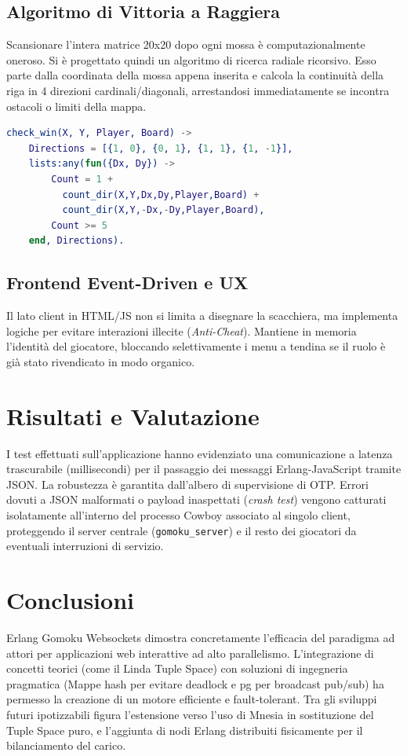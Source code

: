 \documentclass{article}
\begin{document}
\subsection{Algoritmo di Vittoria a Raggiera}
Scansionare l'intera matrice 20x20 dopo ogni mossa \`e computazionalmente oneroso. Si \`e progettato quindi un algoritmo di ricerca radiale ricorsivo. Esso parte dalla coordinata della mossa appena inserita e calcola la continuit\`a della riga in 4 direzioni cardinali/diagonali, arrestandosi immediatamente se incontra ostacoli o limiti della mappa.

\begin{lstlisting}[language=Erlang, caption=Algoritmo di scansione radiale direzionale]
check_win(X, Y, Player, Board) ->
    Directions = [{1, 0}, {0, 1}, {1, 1}, {1, -1}],
    lists:any(fun({Dx, Dy}) ->
        Count = 1 + 
          count_dir(X,Y,Dx,Dy,Player,Board) +
          count_dir(X,Y,-Dx,-Dy,Player,Board),
        Count >= 5
    end, Directions).
\end{lstlisting}

\subsection{Frontend Event-Driven e UX}
Il lato client in HTML/JS non si limita a disegnare la scacchiera, ma implementa logiche per evitare interazioni illecite (\textit{Anti-Cheat}). Mantiene in memoria l'identit\`a del giocatore, bloccando selettivamente i menu a tendina se il ruolo \`e gi\`a stato rivendicato in modo organico.

\section{Risultati e Valutazione}
I test effettuati sull'applicazione hanno evidenziato una comunicazione a latenza trascurabile (millisecondi) per il passaggio dei messaggi Erlang-JavaScript tramite JSON. 
La robustezza \`e garantita dall'albero di supervisione di OTP. Errori dovuti a JSON malformati o payload inaspettati (\textit{crash test}) vengono catturati isolatamente all'interno del processo Cowboy associato al singolo client, proteggendo il server centrale (\texttt{gomoku\_server}) e il resto dei giocatori da eventuali interruzioni di servizio.

\section{Conclusioni}
Erlang Gomoku Websockets dimostra concretamente l'efficacia del paradigma ad attori per applicazioni web interattive ad alto parallelismo. L'integrazione di concetti teorici (come il Linda Tuple Space) con soluzioni di ingegneria pragmatica (Mappe hash per evitare deadlock e pg per broadcast pub/sub) ha permesso la creazione di un motore efficiente e fault-tolerant.
Tra gli sviluppi futuri ipotizzabili figura l'estensione verso l'uso di Mnesia in sostituzione del Tuple Space puro, e l'aggiunta di nodi Erlang distribuiti fisicamente per il bilanciamento del carico.
\end{document}
